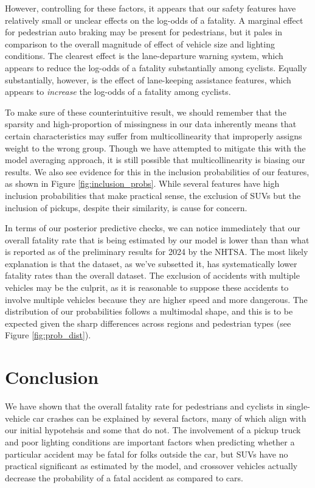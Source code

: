 \documentclass[12pt]{article}
\begin{document}
However, controlling for these factors, it appears that our safety features have relatively small or unclear effects on
the log-odds of a fatality. A marginal effect for pedestrian auto braking may be present for pedestrians, but it pales 
in comparison to the overall magnitude of effect of vehicle size and lighting conditions.
The clearest effect is the lane-departure warning system, which appears to reduce the
log-odds of a fatality substantially among cyclists. Equally substantially, however, is the effect of lane-keeping
assistance features, which appears to \textit{increase} the log-odds of a fatality among cyclists. 

To make sure of these counterintuitive result, we should remember that the sparsity and high-proportion of missingness
in our data inherently means that certain characteristics may suffer from multicollinearity that improperly
assigns weight to the wrong group. Though we have attempted to mitigate this with the 
model averaging approach, it is still possible that multicollinearity is biasing our results. We also see evidence
for this in the inclusion probabilities of our features, as shown in Figure \ref{fig:inclusion_probs}. While
several features have high inclusion probabilities that make practical sense, the exclusion of SUVs but the 
inclusion of pickups, despite their similarity, is cause for concern.


In terms of our posterior predictive checks, we can notice immediately that our overall fatality
rate that is being estimated by our model is lower than than what is reported
as of the preliminary results for 2024 by the NHTSA. The most likely explanation is that the dataset, as we've subsetted
it, has systematically lower fatality rates than the overall dataset. The exclusion of accidents
with multiple vehicles may be the culprit, as it is reasonable to suppose these accidents to involve
multiple vehicles because they are higher speed and more dangerous. The distribution of our probabilities follows
a multimodal shape, and this is to be expected given the sharp differences across regions
and pedestrian types (see Figure \ref{fig:prob_dist}).


\section{Conclusion}

We have shown that the overall fatality rate for pedestrians and cyclists in single-vehicle car 
crashes can be explained by several factors, many of which align with our initial hypotehsis and 
some that do not. The involvement of a pickup truck and poor lighting conditions are important factors 
when predicting whether a particular accident may be fatal for folks outside the car, but SUVs have no practical
significant as estimated by the model, and crossover vehicles actually decrease the probability of a fatal accident
as compared to cars. 
\end{document}
